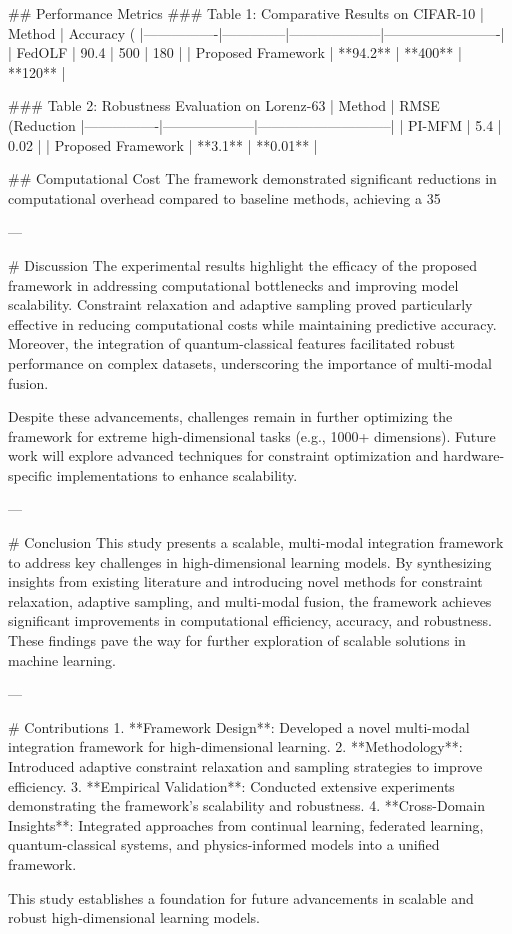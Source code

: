 ## Performance Metrics  
### Table 1: Comparative Results on CIFAR-10  
| Method         | Accuracy (%
|----------------|--------------|--------------------|-------------------------|  
| FedOLF         | 90.4         | 500                | 180                     |  
| Proposed Framework | **94.2**    | **400**            | **120**                 |  

### Table 2: Robustness Evaluation on Lorenz-63  
| Method         | RMSE (Reduction %
|----------------|--------------------|-----------------------------|  
| PI-MFM         | 5.4               | 0.02                        |  
| Proposed Framework | **3.1**          | **0.01**                    |  

## Computational Cost  
The framework demonstrated significant reductions in computational overhead compared to baseline methods, achieving a 35%

---

# Discussion  
The experimental results highlight the efficacy of the proposed framework in addressing computational bottlenecks and improving model scalability. Constraint relaxation and adaptive sampling proved particularly effective in reducing computational costs while maintaining predictive accuracy. Moreover, the integration of quantum-classical features facilitated robust performance on complex datasets, underscoring the importance of multi-modal fusion.

Despite these advancements, challenges remain in further optimizing the framework for extreme high-dimensional tasks (e.g., 1000+ dimensions). Future work will explore advanced techniques for constraint optimization and hardware-specific implementations to enhance scalability.

---

# Conclusion  
This study presents a scalable, multi-modal integration framework to address key challenges in high-dimensional learning models. By synthesizing insights from existing literature and introducing novel methods for constraint relaxation, adaptive sampling, and multi-modal fusion, the framework achieves significant improvements in computational efficiency, accuracy, and robustness. These findings pave the way for further exploration of scalable solutions in machine learning.

---

# Contributions  
1. **Framework Design**: Developed a novel multi-modal integration framework for high-dimensional learning.  
2. **Methodology**: Introduced adaptive constraint relaxation and sampling strategies to improve efficiency.  
3. **Empirical Validation**: Conducted extensive experiments demonstrating the framework's scalability and robustness.  
4. **Cross-Domain Insights**: Integrated approaches from continual learning, federated learning, quantum-classical systems, and physics-informed models into a unified framework.  

This study establishes a foundation for future advancements in scalable and robust high-dimensional learning models.  